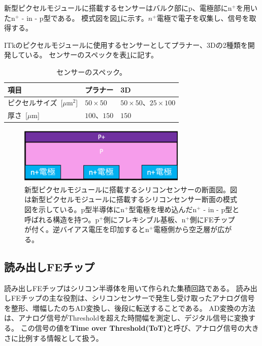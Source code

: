 新型ピクセルモジュールに搭載するセンサーはバルク部にp、電極部にn${}^+$を用いたn${}^+$ - in - p型である。
模式図を図\ref{sensor_image}に示す。$n^+$電極で電子を収集し、信号を取得する。

ITkのピクセルモジュールに使用するセンサーとしてプラナー、3Dの2種類を開発している\cite{1-3}。
センサーのスペックを表\ref{sensor_spec}に記す。

\begin{table}[tbp]
\begin{center}
\caption[センサーのスペック]{センサーのスペック。}
\label{sensor_spec}
  \begin{tabular}{|lll|} \hline
    項目 & プラナー & 3D \\\hline
    ピクセルサイズ~[$\mu$m${^2}$] & $50\times 50$ & $50\times 50$、$25\times 100$ \\
    厚さ~[$\mu$m] & $100、150$ & $150$  \\\hline
  \end{tabular}
\end{center}
\end{table}


\begin{figure}[bpt]\centering
\includegraphics[width=8cm]{./sensor_image.png}
\caption[新型ピクセルモジュールに搭載するシリコンセンサーの断面図]{新型ピクセルモジュールに搭載するシリコンセンサーの断面図。図は新型ピクセルモジュールに搭載するシリコンセンサー断面の模式図を示している。p型半導体にn${}^+$型電極を埋め込んだn${}^+$ - in - p型と呼ばれる構造を持つ。p${}^+$側にフレキシブル基板、n${}^+$側にFEチップが付く。逆バイアス電圧を印加するとn${}^+$電極側から空乏層が広がる。}
\label{sensor_image}
\end{figure}

\subsection{読み出しFEチップ}
読み出しFEチップはシリコン半導体を用いて作られた集積回路である。
読み出しFEチップの主な役割は、シリコンセンサーで発生し受け取ったアナログ信号を整形、増幅したのちAD変換し、後段に転送することである。
AD変換の方法は、アナログ信号がThresholdを超えた時間幅を測定し、デジタル信号に変換する。
この信号の値を\textbf{Time over Threshold(ToT)}と呼び、アナログ信号の大きさに比例する情報として扱う。

